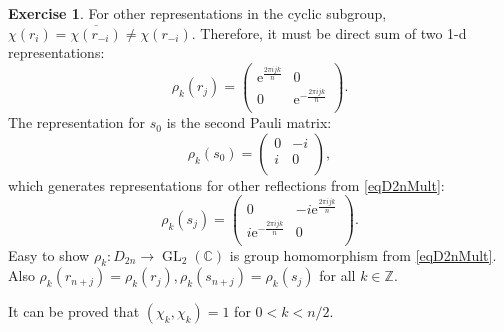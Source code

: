 \documentclass[12pt, letterpaper]{article}
\newcommand{\inte}{\mathbb{Z}}
\newcommand{\co}{\mathbb{C}}
\newcommand{\ee}{\mathrm{e}}
\newcommand{\GL}{\operatorname{GL}}
\newcommand{\conj}{\overline}
\theoremstyle{definition}
\theoremstyle{remark}
\theoremstyle{definition}
\newtheorem{exe}{Exercise}[section]
\theoremstyle{plain}
\numberwithin{equation}{section}
\begin{document}
\begin{exe}
		For other representations in the cyclic subgroup, $\chi(r_i)=\conj{\chi(r_{-i})}\ne\chi(r_{-i})$.
		Therefore, it must be direct sum of two 1-d representations:
		\[\rho_k(r_j)=\begin{pmatrix}
			\ee^{\frac{2\pi ijk}{n}}&0\\
			0&\ee^{-\frac{2\pi ijk}{n}}\\
		\end{pmatrix}.\]
		The representation for $s_0$ is the second Pauli matrix:
		\[\rho_k(s_0)=\begin{pmatrix}
			0&-i\\
			i&0\\
		\end{pmatrix},
		\]
		which generates representations for other reflections from \eqref{eqD2nMult}:
		\[
		\rho_k(s_j)=\begin{pmatrix}
			0 & -i\ee^{\frac{2\pi ijk}{n}}\\
			i\ee^{-\frac{2\pi ijk}{n}}&0\\
		\end{pmatrix}.
		\]
		Easy to show $\rho_k\colon D_{2n}\to \GL_2(\co)$ is group homomorphism from \eqref{eqD2nMult}.
		Also $\rho_k(r_{n+j})=\rho_k(r_{j}),\rho_k(s_{n+j})=\rho_k(s_{j})$ for all $k\in\inte$.
		
		It can be proved that $(\chi_k,\chi_k)=1$ for $0<k<n/2$.
		

\end{exe}
\end{document}
